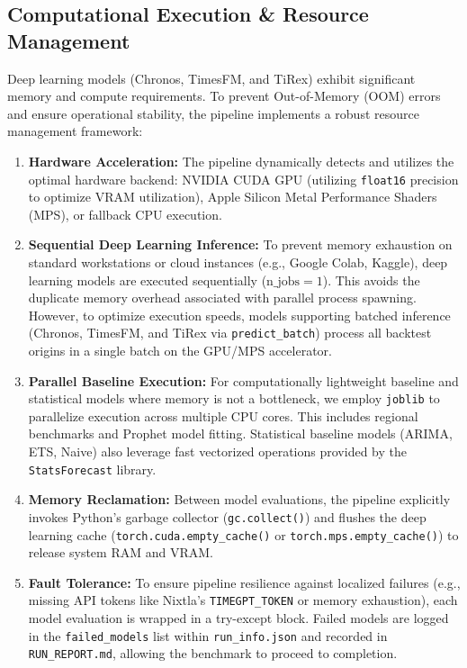 \subsection{Computational Execution \& Resource Management}
Deep learning models (Chronos, TimesFM, and TiRex) exhibit significant memory and compute requirements. To prevent Out-of-Memory (OOM) errors and ensure operational stability, the pipeline implements a robust resource management framework:
\begin{enumerate}
    \item \textbf{Hardware Acceleration:} The pipeline dynamically detects and utilizes the optimal hardware backend: NVIDIA CUDA GPU (utilizing \texttt{float16} precision to optimize VRAM utilization), Apple Silicon Metal Performance Shaders (MPS), or fallback CPU execution.
    \item \textbf{Sequential Deep Learning Inference:} To prevent memory exhaustion on standard workstations or cloud instances (e.g., Google Colab, Kaggle), deep learning models are executed sequentially ($\text{n\_jobs}=1$). This avoids the duplicate memory overhead associated with parallel process spawning. However, to optimize execution speeds, models supporting batched inference (Chronos, TimesFM, and TiRex via \texttt{predict\_batch}) process all backtest origins in a single batch on the GPU/MPS accelerator.
    \item \textbf{Parallel Baseline Execution:} For computationally lightweight baseline and statistical models where memory is not a bottleneck, we employ \texttt{joblib} to parallelize execution across multiple CPU cores. This includes regional benchmarks and Prophet model fitting. Statistical baseline models (ARIMA, ETS, Naive) also leverage fast vectorized operations provided by the \texttt{StatsForecast} library.
    \item \textbf{Memory Reclamation:} Between model evaluations, the pipeline explicitly invokes Python's garbage collector (\texttt{gc.collect()}) and flushes the deep learning cache (\texttt{torch.cuda.empty\_cache()} or \texttt{torch.mps.empty\_cache()}) to release system RAM and VRAM.
    \item \textbf{Fault Tolerance:} To ensure pipeline resilience against localized failures (e.g., missing API tokens like Nixtla's \texttt{TIMEGPT\_TOKEN} or memory exhaustion), each model evaluation is wrapped in a try-except block. Failed models are logged in the \texttt{failed\_models} list within \texttt{run\_info.json} and recorded in \texttt{RUN\_REPORT.md}, allowing the benchmark to proceed to completion.

\end{enumerate}
